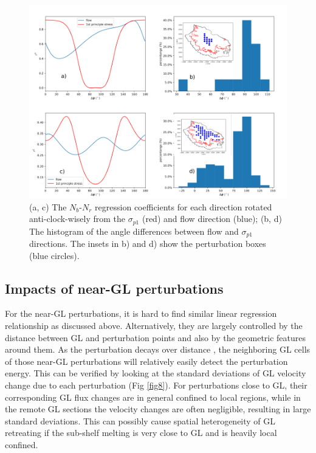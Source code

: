 \documentclass[review,oneside]{igs}
\begin{document}
\begin{figure}
	\centering
    \includegraphics[width=1\linewidth]{figs/fig7_new.pdf}
    \caption{(a, c) The $N_b$-$N_r$ regression coefficients for each direction rotated anti-clock-wisely from the $\sigma_{p1}$ (red) and flow direction (blue); (b, d) The histogram of the angle differences between flow and $\sigma_{p1}$ directions. The insets in b) and d) show the perturbation boxes (blue circles).}
	\label{fig7}
\end{figure}

\subsection{Impacts of near-GL perturbations}
For the near-GL perturbations, it is hard to find similar linear regression relationship as discussed above. Alternatively, they are largely controlled by the distance between GL and perturbation points and also by the geometric features around them. As the perturbation decays over distance \citep{lick1970}, the neighboring GL cells of those near-GL perturbations will relatively easily detect the perturbation energy. This can be verified by looking at the standard deviations of GL velocity change due to each perturbation (Fig \ref{fig8}). For perturbations close to GL, their corresponding GL flux changes are in general confined to local regions, while in the remote GL sections the velocity changes are often negligible, resulting in large standard deviations. This can possibly cause spatial heterogeneity of GL retreating if the sub-shelf melting is very close to GL and is heavily local confined. 
\end{document}
